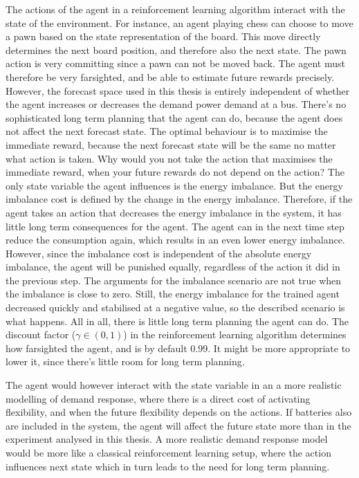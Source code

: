 \documentclass[class=book, crop=false, 11pt]{standalone}
\begin{document}
The actions of the agent in a reinforcement learning algorithm interact with the state of the environment. For instance, an agent playing chess can choose to move a pawn based on the state representation of the board. This move directly determines the next board position, and therefore also the next state. The pawn action is very committing since a pawn can not be moved back. The agent must therefore be very farsighted, and be able to estimate future rewards precisely. However, the forecast space used in this thesis is entirely independent of whether the agent increases or decreases the demand power demand at a bus. There's no sophisticated long term planning that the agent can do, because the agent does not affect the next forecast state. The optimal behaviour is to maximise the immediate reward, because the next forecast state will be the same no matter what action is taken. Why would you not take the action that maximises the immediate reward, when your future rewards do not depend on the action? The only state variable the agent influences is the energy imbalance. But the energy imbalance cost is defined by the change in the energy imbalance. Therefore, if the agent takes an action that decreases the energy imbalance in the system, it has little long term consequences for the agent. The agent can in the next time step reduce the consumption again, which results in an even lower energy imbalance. However, since the imbalance cost is independent of the absolute energy imbalance, the agent will be punished equally, regardless of the action it did in the previous step. The arguments for the imbalance scenario are not true when the imbalance is close to zero. Still, the energy imbalance for the trained agent decreased quickly and stabilised at a negative value, so the described scenario is what happens. All in all, there is little long term planning the agent can do. The discount factor ($\gamma \in (0,1)$) in the reinforcement learning algorithm determines how farsighted the agent, and is by default 0.99. It might be more appropriate to lower it, since there's little room for long term planning.  

The agent would however interact with the state variable in an a more realistic modelling of demand response, where there is a direct cost of activating flexibility, and when the future flexibility depends on the actions. If batteries also are included in the system, the agent will affect the future state more than in the experiment analysed in this thesis. A more realistic demand response model would be more like a classical reinforcement learning setup, where the action influences next state which in turn leads to the need for long term planning.
\end{document}

